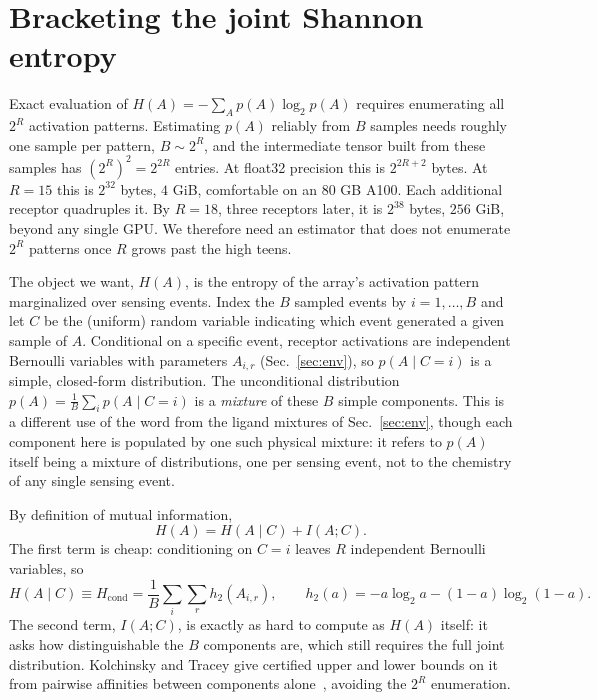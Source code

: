 \documentclass[aps,pre,superscriptaddress,floatfix,longbibliography]{revtex4-2}
\begin{document}
\section{Bracketing the joint Shannon entropy}
\label{sec:entropy}

Exact evaluation of $H(A) = -\sum_A p(A)\log_2 p(A)$ requires enumerating
all $2^R$ activation patterns. Estimating $p(A)$ reliably from $B$ samples
needs roughly one sample per pattern, $B\sim2^R$, and the intermediate
tensor built from these samples has $(2^R)^2=2^{2R}$ entries. At float32
precision this is $2^{2R+2}$ bytes. At $R=15$ this is $2^{32}$ bytes,
$4$ GiB, comfortable on an 80 GB A100. Each additional receptor quadruples
it. By $R=18$, three receptors later, it is $2^{38}$ bytes, $256$ GiB,
beyond any single GPU. We therefore need an estimator that does not
enumerate $2^R$ patterns once $R$ grows past the high teens.

The object we want, $H(A)$, is the entropy of the array's activation
pattern marginalized over sensing events. Index the $B$ sampled events by
$i=1,\dots,B$ and let $C$ be the (uniform) random variable indicating which
event generated a given sample of $A$. Conditional on a specific event,
receptor activations are independent Bernoulli variables with parameters
$A_{i,r}$ (Sec.~\ref{sec:env}), so $p(A\mid C=i)$ is a simple, closed-form
distribution. The unconditional distribution $p(A)=\frac1B\sum_i p(A\mid C=i)$
is a \emph{mixture} of these $B$ simple components. This is a different use
of the word from the ligand mixtures of Sec.~\ref{sec:env}, though each
component here is populated by one such physical mixture: it refers to
$p(A)$ itself being a mixture of distributions, one per sensing event, not
to the chemistry of any single sensing event.

By definition of mutual information,
\begin{equation}
H(A) = H(A\mid C) + I(A;C).
\label{eq:mixture_decomp}
\end{equation}
The first term is cheap: conditioning on $C=i$ leaves $R$ independent
Bernoulli variables, so
\begin{equation}
H(A\mid C) \equiv H_\text{cond} = \frac{1}{B}\sum_i \sum_r h_2(A_{i,r}),
\qquad
h_2(a) = -a\log_2 a - (1-a)\log_2(1-a).
\label{eq:hcond}
\end{equation}
The second term, $I(A;C)$, is exactly as hard to compute as $H(A)$ itself:
it asks how distinguishable the $B$ components are, which still requires
the full joint distribution. Kolchinsky and Tracey give certified upper and
lower bounds on it from pairwise affinities between components
alone~\cite{kolchinsky_estimating_2017}, avoiding the $2^R$ enumeration.
\end{document}

